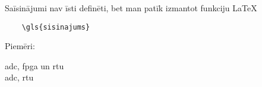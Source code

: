 Saīsinājumi nav īsti definēti, bet man patīk izmantot funkciju \LaTeX
\begin{verbatim}
    \gls{sisinajums}    
\end{verbatim} 
Piemēri:\par
\gls{adc}, \gls{fpga} un \gls{rtu} \lipsum[1-1]
\\
\gls{adc}, \gls{rtu}
\par
\lipsum[2-2]